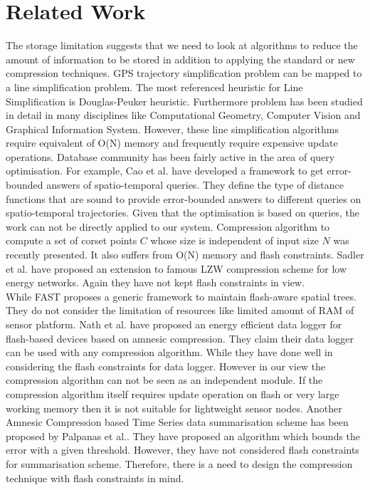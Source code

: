 \documentclass[conference]{IEEEtran}
\begin{document}
\section{Related Work}
The storage limitation suggests that we need to look at algorithms to reduce the amount of information to be stored in addition to 
applying the standard or new compression techniques.  GPS trajectory simplification problem can be mapped to a line simplification 
problem. The most referenced  heuristic for Line Simplification is Douglas-Peuker heuristic\cite{peuker-73}. Furthermore problem has 
been studied in detail in many disciplines like Computational Geometry\cite{geometry-1}\cite{geometry-2}, Computer Vision\cite{vision} 
and Graphical Information System\cite{peuker-73}\cite{gis}. However, these line simplification algorithms require equivalent of O(N) 
memory and frequently require expensive update operations. Database community has been fairly active in the area of query optimisation. 
For example, Cao et al. have developed a  framework to get error-bounded answers of spatio-temporal queries\cite{Cao:2006:SDR:1147679.1147681}. 
They define the type of distance functions that are sound to provide error-bounded answers to different queries on spatio-temporal trajectories. 
Given that the optimisation is based on queries, the work can not be directly applied to our system.  Compression algorithm to compute a set of 
corset points $C$ whose size is independent of input size $N$ was recently presented\cite{mit-ipsn}. It also suffers from O(N) memory and flash 
constraints. Sadler et al. have proposed an extension to famous LZW compression scheme for low energy networks. Again they have not kept 
flash constraints in view.\\
While FAST\cite{sarwat-fast} proposes a generic framework to maintain flash-aware spatial trees. They do not consider the limitation 
of resources like limited amount of RAM of sensor platform. Nath et al. have proposed an energy efficient data logger for flash-based 
devices based on amnesic compression\cite{Nath:2009:EES:1602165.1602181}. They claim their data logger can be used with any 
compression algorithm. While they have done well in considering the flash constraints for data logger. However in our view the 
compression algorithm can not be seen as an independent module. If the compression algorithm itself requires update operation on 
flash or very large working memory then it is not suitable for  lightweight sensor nodes. Another Amnesic Compression based Time 
Series data summarisation scheme has been proposed by Palpanas et al.\cite{amnesic}. They have proposed an algorithm which 
bounds the error with a given threshold. However, they have not considered flash constraints for summarisation scheme. Therefore, 
there is a need to design the compression technique with flash constraints in mind.
\end{document}
